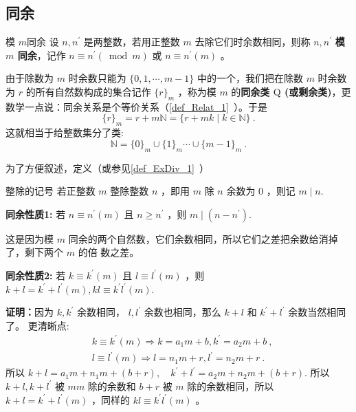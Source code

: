 
\subsection{同余}
\begin{definition}{模 $m$同余}
设 $n, n^{\prime}$ 是两整数，若用正整数 $m$ 去除它们时余数相同，则称 $n, n^{\prime}$ \textbf{模 $m$ 同余}，记作 $n \equiv n^{\prime}(\bmod m)$ 或 $n \equiv n^{\prime}(m)$ 。 
\end{definition} 
由于除数为 $m$ 时余数只能为 $\{0,1, \cdots, m-1\}$ 中的一个，我们把在除数 $m$ 时余数为 $r$ 的所有自然数构成的集合记作 $\{r\}_m$ ，称为模 $m$ 的\textbf{同余类 $\mathrm{Q}$ (或剩余类)}，更数学一点说：同余关系是个等价关系（\autoref{def_Relat_1}~）。于是
\begin{equation}
\{r\}_m=r+m \mathbb{N}=\{r+m k \mid k \in \mathbb{N}\}~.
\end{equation}
这就相当于给整数集分了类:
\begin{equation}
\mathbb{N}=\{0\}_m \cup\{1\}_m \cdots \cup\{m-1\}_m~.
\end{equation}

为了方便叙述，定义（或参见\autoref{def_ExDiv_1}~）
\begin{definition}{整除的记号}
若正整数 $m$ 整除整数 $n$ ，即用 $m$ 除 $n$ 余数为 0 ，则记 $m \mid n$.
\end{definition}
\textbf{同余性质1:} 若 $n \equiv n^{\prime}(m)$ 且 $n \geq n^{\prime}$ ，则 $m \mid\left(n-n^{\prime}\right)$.

这是因为模 $m$ 同余的两个自然数，它们余数相同，所以它们之差把余数给消掉了，剩下两个 $m$ 的倍 数之差。

\textbf{同余性质2:} 若 $k \equiv k^{\prime}(m)$ 且 $l \equiv l^{\prime}(m)$ ，则 $k+l=k^{\prime}+l^{\prime}(m), k l \equiv k^{\prime} l^{\prime}(m)$.

\textbf{证明：}因为 $k, k^{\prime}$ 余数相同， $l, l^{\prime}$ 余数也相同，那么 $k+l$ 和 $k^{\prime}+l^{\prime}$ 余数当然相同了。
更清晰点:
\begin{equation}
\begin{aligned}
& k \equiv k^{\prime}(m) \Rightarrow k=a_1 m+b, k^{\prime}=a_2 m+b~, \\
& l \equiv l^{\prime}(m) \Rightarrow l=n_1 m+r, l^{\prime}=n_2 m+r~.
\end{aligned}
\end{equation}
所以 $k+l=a_1 m+n_1 m+(b+r), \quad k^{\prime}+l^{\prime}=a_2 m+n_2 m+(b+r).$
所以 $k+l, k+l^{\prime}$ 被 $m m$ 除的余数和 $b+r$ 被 $m$ 除的余数相同，所以 $k+l=k^{\prime}+l^{\prime}(m)$
，同样的 $k l \equiv k^{\prime} l^{\prime}(m)$ 。

